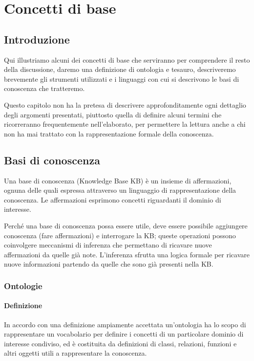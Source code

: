 \chapter{Concetti di base}

\section{Introduzione}
Qui illustriamo alcuni dei concetti di base che serviranno per comprendere il resto della discussione, daremo una definizione di ontologia e tesauro, descriveremo brevemente gli strumenti utilizzati e i linguaggi con cui si descrivono le basi di conoscenza che tratteremo.

Questo capitolo non ha la pretesa di descrivere approfonditamente ogni dettaglio degli argomenti presentati, piuttosto quella di definire alcuni termini che ricorreranno frequentemente nell'elaborato, per permettere la lettura anche a chi non ha mai trattato con la rappresentazione formale della conoscenza.


\section{Basi di conoscenza}
Una base di conoscenza (Knowledge Base KB) è un insieme di affermazioni, ognuna delle quali espressa attraverso un linguaggio di rappresentazione della conoscenza. Le affermazioni esprimono concetti riguardanti il dominio di interesse.

Perché una base di conoscenza possa essere utile, deve essere possibile aggiungere conoscenza (fare affermazioni) e interrogare la KB; queste operazioni possono coinvolgere meccanismi di inferenza che permettano di ricavare nuove affermazioni da quelle già note. L'inferenza sfrutta una logica formale per ricavare nuove informazioni partendo da quelle che sono già presenti nella KB.\cite{russell2010artificial}
\subsection{Ontologie}
\subsubsection{Definizione}
In accordo con una definizione ampiamente accettata \cite{hitzler2021review} un'ontologia ha lo scopo di rappresentare un vocabolario per definire i concetti di un particolare dominio di interesse condiviso, ed è costituita da definizioni di classi, relazioni, funzioni e altri oggetti utili a rappresentare la conoscenza\cite{gruber1993translation}. 

